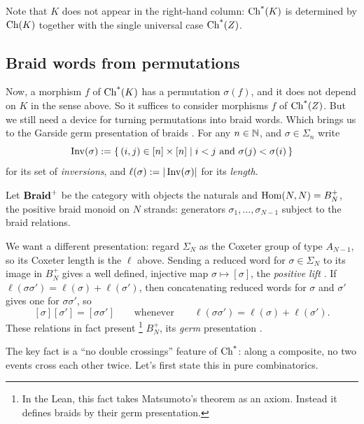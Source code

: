 \documentclass[11pt]{article}
\begin{document}
Note that $K$ does not appear in the right-hand column: $\operatorname{Ch^*}(K)$ is determined by $\operatorname{Ch}(K)$
together with the single universal case $\operatorname{Ch^*}(Z)$.

\subsection{Braid words from permutations}

Now, a morphism $f$ of $\operatorname{Ch^*}(K)$ has a permutation $\sigma(f)$, and it does not depend on $K$ 
in the sense above.
So it suffices to consider morphisms $f$ of $\operatorname{Ch^*}(Z)$. 
But we still need a device for turning permutations into braid words. 
Which brings us to the Garside germ presentation of braids \cite{Garsidebook}. 
For any $n \in \mathbb{N}$, and $\sigma \in \Sigma_n$ write
\[
  \operatorname{Inv}(\sigma) := \{\, (i,j) \in [n] \times [n] \mid i < j \text{ and } \sigma(j) < \sigma(i) \,\}
\]
for its set of \emph{inversions}, and $\ell(\sigma) := |\operatorname{Inv}(\sigma)|$ for its \emph{length}. 

\begin{definition}\label{def:braid}
  Let $\mathbf{Braid}^{+}$ be the category with objects the naturals and $\operatorname{Hom}(N,N) = B_N^+$, the positive
  braid monoid on $N$ strands: generators $\sigma_1, \dots, \sigma_{N-1}$ subject to the braid
  relations.
  
  We want a different presentation: regard $\Sigma_N$ as the Coxeter group of type 
  $A_{N-1}$, so its Coxeter length is the $\ell$ above. 
  Sending a reduced word for $\sigma \in \Sigma_N$ to its image in $B_N^+$ gives
  a well defined, injective map $\sigma \mapsto [\sigma]$, the \emph{positive lift}
  \cite[Lem.~IX.1.22]{Garsidebook}. If $\ell(\sigma\sigma') = \ell(\sigma) + \ell(\sigma')$, then
  concatenating reduced words for $\sigma$ and $\sigma'$ gives one for $\sigma\sigma'$, so
  \[
    [\sigma][\sigma'] = [\sigma\sigma'] \qquad\text{whenever}\qquad \ell(\sigma\sigma') = \ell(\sigma) + \ell(\sigma').
  \]
  These relations in fact present 
    \footnote{In the Lean, this fact takes Matsumoto's theorem as an axiom. Instead it defines braids by their germ presentation.} 
  $B_N^+$, its \emph{germ} presentation 
  \cite[Prop.~IX.1.35]{Garsidebook}.
\end{definition}

The key fact is a ``no double crossings'' feature of $\operatorname{Ch^*}$: along a composite, no two events cross
each other twice. Let's first state this in pure combinatorics.
\end{document}
